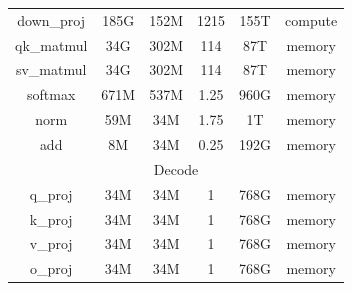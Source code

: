 \begin{table}[tb]
{\begin{tabular}{@{}cccccc@{}}
down\_proj & 185G & 152M                                                    & 1215                                                           & 155T                                                      & compute \\
qk\_matmul & 34G  & 302M                                                    & 114                                                            & 87T                                                       & memory  \\
sv\_matmul & 34G  & 302M                                                    & 114                                                            & 87T                                                       & memory  \\
softmax    & 671M & 537M                                                    & 1.25                                                           & 960G                                                      & memory  \\
norm       & 59M  & 34M                                                     & 1.75                                                           & 1T                                                        & memory  \\
add        & 8M   & 34M                                                     & 0.25                                                           & 192G                                                      & memory  \\ \midrule
\multicolumn{6}{c}{Decode}                                                                                                                                                                                         \\ \midrule
q\_proj    & 34M  & 34M                                                     & 1                                                              & 768G                                                      & memory  \\
k\_proj    & 34M  & 34M                                                     & 1                                                              & 768G                                                      & memory  \\
v\_proj    & 34M  & 34M                                                     & 1                                                              & 768G                                                      & memory  \\
o\_proj    & 34M  & 34M                                                     & 1                                                              & 768G                                                      & memory  \\

\end{tabular}}
\end{table}
